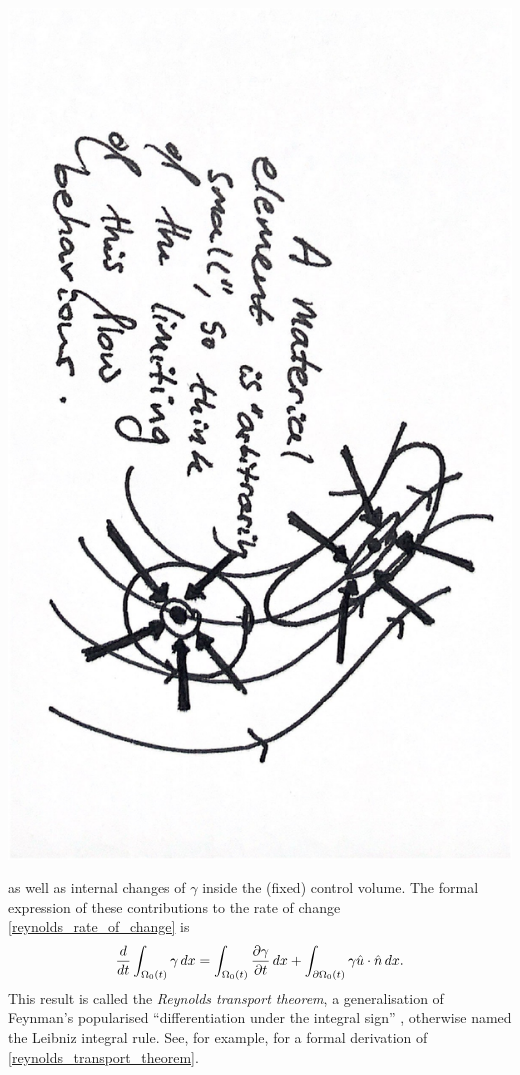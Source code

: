 \begin{center}
\includegraphics[angle=90,page=7,width=0.66\linewidth]{figures/2.pdf}
\end{center}

as well as internal changes of $\gamma$ inside the (fixed) control volume.
The formal expression of these contributions to the rate of change \eqref{reynolds_rate_of_change} is
\begin{equation}\label{reynolds_transport_theorem}
    \frac{d}{dt}\int_{\Omega_0(t)}\gamma\,dx = 
        \int_{\Omega_0(t)}\frac{\partial \gamma}{\partial t}\,dx + \int_{\partial\Omega_0(t)}\gamma \hat{u}\cdot\hat{n} \,dx.
\end{equation}
This result is called the \textit{Reynolds transport theorem},
a generalisation of Feynman's popularised ``differentiation under the integral sign'' \cite{feynman_trick},
otherwise named the Leibniz integral rule. See, for example, \cite{leal} for a formal derivation of \eqref{reynolds_transport_theorem}.
